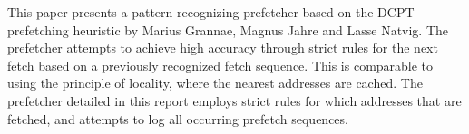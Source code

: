 This paper presents a pattern-recognizing prefetcher based on the DCPT prefetching heuristic by Marius Grannae, Magnus Jahre and Lasse Natvig. The prefetcher attempts to achieve high accuracy through strict rules for the next fetch based on a previously recognized fetch sequence. This is comparable to using the principle of locality, where the nearest addresses are cached. The prefetcher detailed in this report employs strict rules for which addresses that are fetched, and attempts to log all occurring prefetch sequences.